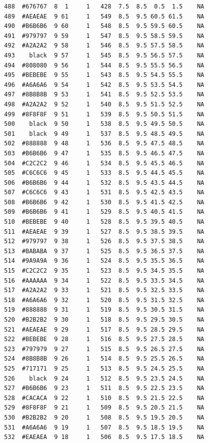 \documentclass[12pt,twoside]{reedthesis}
\begin{document}
\begin{verbatim}
  488  #676767  8  1     1   428  7.5  8.5  0.5  1.5    NA
  489  #AEAEAE  9 61     1   549  8.5  9.5 60.5 61.5    NA
  490  #B6B6B6  9 60     1   548  8.5  9.5 59.5 60.5    NA
  491  #979797  9 59     1   547  8.5  9.5 58.5 59.5    NA
  492  #A2A2A2  9 58     1   546  8.5  9.5 57.5 58.5    NA
  493    black  9 57     1   545  8.5  9.5 56.5 57.5    NA
  494  #808080  9 56     1   544  8.5  9.5 55.5 56.5    NA
  495  #BEBEBE  9 55     1   543  8.5  9.5 54.5 55.5    NA
  496  #A6A6A6  9 54     1   542  8.5  9.5 53.5 54.5    NA
  497  #8B8B8B  9 53     1   541  8.5  9.5 52.5 53.5    NA
  498  #A2A2A2  9 52     1   540  8.5  9.5 51.5 52.5    NA
  499  #8F8F8F  9 51     1   539  8.5  9.5 50.5 51.5    NA
  500    black  9 50     1   538  8.5  9.5 49.5 50.5    NA
  501    black  9 49     1   537  8.5  9.5 48.5 49.5    NA
  502  #888888  9 48     1   536  8.5  9.5 47.5 48.5    NA
  503  #B6B6B6  9 47     1   535  8.5  9.5 46.5 47.5    NA
  504  #C2C2C2  9 46     1   534  8.5  9.5 45.5 46.5    NA
  505  #C6C6C6  9 45     1   533  8.5  9.5 44.5 45.5    NA
  506  #B6B6B6  9 44     1   532  8.5  9.5 43.5 44.5    NA
  507  #C6C6C6  9 43     1   531  8.5  9.5 42.5 43.5    NA
  508  #B6B6B6  9 42     1   530  8.5  9.5 41.5 42.5    NA
  509  #B6B6B6  9 41     1   529  8.5  9.5 40.5 41.5    NA
  510  #BEBEBE  9 40     1   528  8.5  9.5 39.5 40.5    NA
  511  #AEAEAE  9 39     1   527  8.5  9.5 38.5 39.5    NA
  512  #979797  9 38     1   526  8.5  9.5 37.5 38.5    NA
  513  #BABABA  9 37     1   525  8.5  9.5 36.5 37.5    NA
  514  #9A9A9A  9 36     1   524  8.5  9.5 35.5 36.5    NA
  515  #C2C2C2  9 35     1   523  8.5  9.5 34.5 35.5    NA
  516  #AAAAAA  9 34     1   522  8.5  9.5 33.5 34.5    NA
  517  #A2A2A2  9 33     1   521  8.5  9.5 32.5 33.5    NA
  518  #A6A6A6  9 32     1   520  8.5  9.5 31.5 32.5    NA
  519  #888888  9 31     1   519  8.5  9.5 30.5 31.5    NA
  520  #B2B2B2  9 30     1   518  8.5  9.5 29.5 30.5    NA
  521  #AEAEAE  9 29     1   517  8.5  9.5 28.5 29.5    NA
  522  #BEBEBE  9 28     1   516  8.5  9.5 27.5 28.5    NA
  523  #797979  9 27     1   515  8.5  9.5 26.5 27.5    NA
  524  #8B8B8B  9 26     1   514  8.5  9.5 25.5 26.5    NA
  525  #717171  9 25     1   513  8.5  9.5 24.5 25.5    NA
  526    black  9 24     1   512  8.5  9.5 23.5 24.5    NA
  527  #B6B6B6  9 23     1   511  8.5  9.5 22.5 23.5    NA
  528  #CACACA  9 22     1   510  8.5  9.5 21.5 22.5    NA
  529  #8F8F8F  9 21     1   509  8.5  9.5 20.5 21.5    NA
  530  #B2B2B2  9 20     1   508  8.5  9.5 19.5 20.5    NA
  531  #A6A6A6  9 19     1   507  8.5  9.5 18.5 19.5    NA
  532  #EAEAEA  9 18     1   506  8.5  9.5 17.5 18.5    NA

\end{verbatim}
\end{document}
